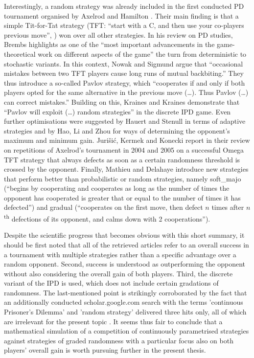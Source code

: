 \documentclass[11pt]{article}
\begin{document}
Interestingly, a random strategy was already included in the first conducted PD tournament organised by Axelrod and Hamilton \cite{AH81}.
Their main finding is that a simple Tit-for-Tat strategy (TFT: “start with a C, and then use your co-players previous move”, \cite{NS93}) won over all other strategies.
In his review on PD studies, Brembs \cite[p.~14]{Bre96} highlights as one of the “most important advancements in the game-theoretical work on different aspects of the game” the turn from deterministic to stochastic variants.
In this context, Nowak and Sigmund \cite[p.~56]{NS93} argue that “occasional mistakes between two TFT players cause long runs of mutual backbiting.” They thus introduce a so-called Pavlov strategy, which “cooperates if and only if both players opted for the same alternative in the previous move (…). Thus Pavlov (…) can correct mistakes.” 
Building on this, Kraines and Kraines \cite[p.~112]{KK93} demonstrate that “Pavlov will exploit (…) random strategies” in the discrete IPD game.
Even further optimisations were suggested by Hauert and Stenull \cite{HS02} in terms of adaptive strategies and by Hao, Li and Zhou \cite{HLZ18} for ways of determining the opponent’s maximum and minimum gain.
Jurišić, Kermek and Konecki \cite{JKK12} report in their review on repetitions of Axelrod’s tournament in 2004 and 2005 on a successful Omega TFT strategy that always defects as soon as a certain randomness threshold is crossed by the opponent. 
Finally, Mathieu and Delahaye \cite[pp.~4, 5]{MD17} introduce new strategies that perform better than probabilistic or random strategies, namely soft\_majo (“begins by cooperating and cooperates as long as the number of times the opponent has cooperated is greater that or equal to the number of times it has defected”) and gradual (“cooperates on the first move, then defect $n$ times after $n$\textsuperscript{th} defections of its opponent, and calms down with 2 cooperations”).

Despite the scientific progress that becomes obvious with this short summary, it should be first noted that all of the retrieved articles refer to an overall success in a tournament with multiple strategies rather than a specific advantage over a random opponent. 
Second, success is understood as outperforming the opponent without also considering the overall gain of both players.
Third, the discrete variant of the IPD is used, which does not include certain gradations of randomness. 
The last-mentioned point is strikingly corroborated by the fact that an additionally conducted scholar.google.com search with the terms 'continuous Prisoner's Dilemma' and 'random strategy' delivered three hits only, all of which are irrelevant for the present topic \cite{Ash08, HLD13, Lei11}. 
It seems thus fair to conclude that a mathematical simulation of a competition of continuously parametrised strategies against strategies of graded randomness with a particular focus also on both players’ overall gain is worth pursuing further in the present thesis. 
\end{document}

